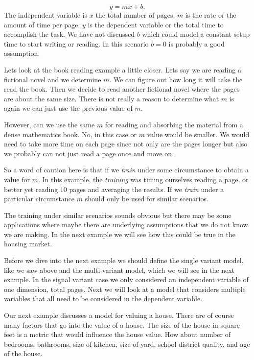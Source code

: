 \begin{equation}
y = mx+b.
\label{eq:svlinmodel}
\end{equation}
\noindent
The independent variable is $x$ the total number of pages, $m$ is the rate or the amount of time per page, $y$ is the dependent variable or the total time to accomplish the task. We have not discussed $b$ which could model a constant setup time to start writing or reading. In this scenario $b=0$ is probably a good assumption. 

Lets look at the book reading example a little closer. Lets say we are reading a fictional novel and we determine $m$. We can figure out how long it will take the read the book. Then we decide to read another fictional novel where the pages are about the same size. There is not really a reason to determine what $m$ is again we can just use the previous value of $m$. 

However, can we use the same $m$ for reading and absorbing the material from a dense mathematics book. No, in this case or $m$ value would be smaller. We would need to take more time on each page since not only are the pages longer but also we probably can not just read a page once and move on.

So a word of caution here is that if we \emph{train} under some circumstance to obtain a value for $m$. In this example, the \emph{training} was timing ourselves reading a page, or better yet reading $10$ pages and averaging the results. If we \emph{train} under a particular circumstance $m$ should only be used for similar scenarios. 

The training under similar scenarios sounds obvious but there may be some applications where maybe there are underlying assumptions that we do not know we are making. In the next example we will see how this could be true in the housing market. 

Before we dive into the next example we should define the single variant model, like we saw above and the multi-variant model, which we will see in the next example. In the signal variant case we only considered an independent variable of one dimension, total pages. Next we will look at a model that considers multiple variables that all need to be considered in the dependent variable. 

Our next example discusses a model for valuing a house. There are of course many factors that go into the value of a house. The size of the house in square feet is a metric that would influence the house value. How about number of bedrooms, bathrooms, size of kitchen, size of yard, school district quality, and age of the house. 

